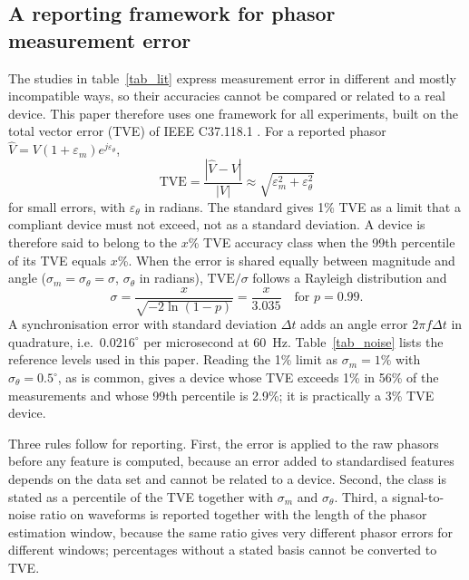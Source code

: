 \documentclass[11pt]{article}
\newenvironment{nw}{}{}
\begin{document}
\subsection{A reporting framework for phasor measurement error}\label{subsec3_err}

\begin{nw}
The studies in table~\ref{tab_lit} express measurement error in different and mostly incompatible ways, so their accuracies cannot be compared or related to a real device. This paper therefore uses one framework for all experiments, built on the total vector error (TVE) of IEEE C37.118.1 \cite{ieeec37118}. For a reported phasor $\hat V=V(1+\varepsilon_m)e^{j\varepsilon_\theta}$,
\begin{equation}\label{eq_tve}
\mathrm{TVE}=\frac{|\hat V-V|}{|V|}\approx\sqrt{\varepsilon_m^2+\varepsilon_\theta^2}
\end{equation}
for small errors, with $\varepsilon_\theta$ in radians. The standard gives 1\% TVE as a limit that a compliant device must not exceed, not as a standard deviation. A device is therefore said to belong to the $x$\% TVE accuracy class when the 99th percentile of its TVE equals $x$\%. When the error is shared equally between magnitude and angle ($\sigma_m=\sigma_\theta=\sigma$, $\sigma_\theta$ in radians), $\mathrm{TVE}/\sigma$ follows a Rayleigh distribution and
\begin{equation}\label{eq_tveclass}
\sigma=\frac{x}{\sqrt{-2\ln(1-p)}}=\frac{x}{3.035}\quad\text{for } p=0.99 .
\end{equation}
A synchronisation error with standard deviation $\Delta t$ adds an angle error $2\pi f\Delta t$ in quadrature, i.e.\ $0.0216^\circ$ per microsecond at 60~Hz. Table~\ref{tab_noise} lists the reference levels used in this paper. Reading the 1\% limit as $\sigma_m=1\%$ with $\sigma_\theta=0.5^\circ$, as is common, gives a device whose TVE exceeds 1\% in 56\% of the measurements and whose 99th percentile is 2.9\%; it is practically a 3\% TVE device.

Three rules follow for reporting. First, the error is applied to the raw phasors before any feature is computed, because an error added to standardised features depends on the data set and cannot be related to a device. Second, the class is stated as a percentile of the TVE together with $\sigma_m$ and $\sigma_\theta$. Third, a signal-to-noise ratio on waveforms is reported together with the length of the phasor estimation window, because the same ratio gives very different phasor errors for different windows; percentages without a stated basis cannot be converted to TVE.
\end{nw}
\end{document}
